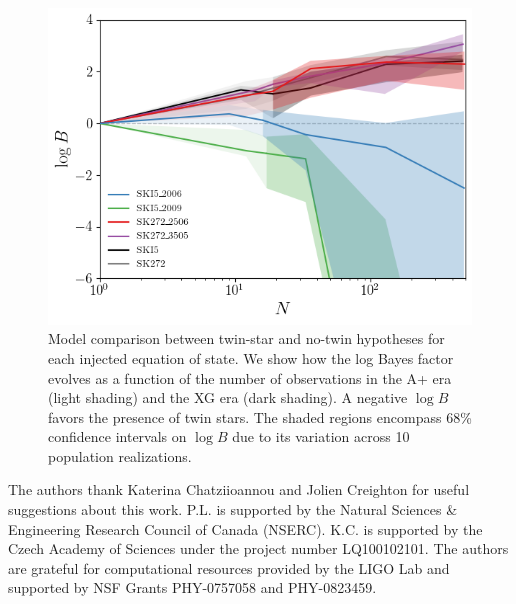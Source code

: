 \documentclass[aps,prl,twocolumn,superscriptaddress,footinbib]{revtex4-1}
\begin{document}
\begin{figure}[hb]
    \centering
    \includegraphics[width=0.9\columnwidth,trim={5 10 5 5},clip]{BFs.png}
    \caption{Model comparison between twin-star and no-twin hypotheses for each injected equation of state. We show how the log Bayes factor evolves as a function of the number of observations in the A+ era (light shading) and the XG era (dark shading). A negative $\log B$ favors the presence of twin stars. The shaded regions encompass 68\% confidence intervals on $\log B$  due to its variation across 10 population realizations.}
    \label{fig:bfs}
\end{figure}

\acknowledgments

The authors thank Katerina Chatziioannou and Jolien Creighton for useful suggestions about this work.
P.L. is supported by the Natural Sciences \& Engineering Research Council of Canada (NSERC).
K.C. is supported by the Czech Academy of Sciences under the project number LQ100102101.
The authors are grateful for computational resources provided by the LIGO Lab and supported by NSF Grants PHY-0757058 and PHY-0823459.



\end{document}
